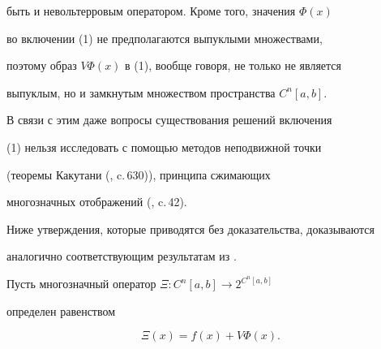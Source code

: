 быть и невольтерровым оператором. Кроме того, значения $\Phi(x)$


во включении (1) не предполагаются выпуклыми множествами,


поэтому образ $V\Phi(x)$ в (1), вообще говоря, не только не является


выпуклым, но и замкнутым множеством пространства $C^n[a,b]$.


В связи с этим даже вопросы существования решений включения


(1) нельзя исследовать с помощью методов неподвижной точки


(теоремы Какутани (\cite{8}, c.\,630)), принципа сжимающих


многозначных отображений (\cite{7}, c.\,42).





Ниже утверждения, которые приводятся без доказательства, доказываются


аналогично соответствующим результатам из \cite{1}.





Пусть многозначный оператор $\Xi:C^n[a,b]\to 2^{C^n[a,b]}$


определен равенством


\begin{equation}


\Xi(x)=f(x)+V\Phi(x).


\end{equation}






